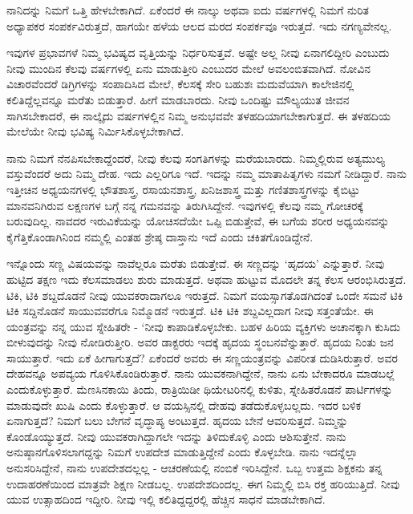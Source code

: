 ನಾನಿದನ್ನು ನಿಮಗೆ ಒತ್ತಿ ಹೇಳಬೇಕಾಗಿದೆ. ಏಕೆಂದರೆ ಈ ನಾಲ್ಕು ಅಥವಾ ಐದು ವರ್ಷಗಳಲ್ಲಿ ನಿಮಗೆ ನುರಿತ ಅಧ್ಯಾಪಕರ ಸಂಪರ್ಕವಿರುತ್ತದೆ, ಹಾಗಯೇ ಹಳೆಯ ಆಲದ ಮರದ ಸಂಪರ್ಕವೂ ಇರುತ್ತದೆ. ಇದು ನಗಣ್ಯವೇನಲ್ಲ.

ಇವುಗಳ ಪ್ರಭಾವಗಳೆ ನಿಮ್ಮ ಭವಿಷ್ಯದ ವೃತ್ತಿಯನ್ನು ನಿರ್ಧರಿಸುತ್ತವೆ. ಅಷ್ಟೇ ಅಲ್ಲ ನೀವು ಏನಾಗಲಿದ್ದೀರಿ ಎಂಬುದು ನೀವು ಮುಂದಿನ ಕೆಲವು ವರ್ಷಗಳಲ್ಲಿ ಏನು ಮಾಡುತ್ತೀರಿ ಎಂಬುದರ ಮೇಲೆ ಅವಲಂಬಿತವಾಗಿದೆ. ನೋವಿನ ವಿಚಾರವೆಂದರೆ ಡಿಗ್ರಿಗಳನ್ನು ಸಂಪಾದಿಸಿದ ಮೇಲೆ, ಕೆಲಸಕ್ಕೆ ಸೇರಿ ಬಹುಶಃ ಮದುವೆಯಾಗಿ ಕಾಲೇಜಿನಲ್ಲಿ ಕಲಿತಿದ್ದೆಲ್ಲವನ್ನೂ ಮರೆತು ಬಿಡುತ್ತಾರೆ. ಹೀಗೆ ಮಾಡಬಾರದು. ನೀವು ಒಂದಿಷ್ಟು ಮೌಲ್ಯಯುತ ಜೀವನ ಸಾಗಿಸಬೇಕಾದರೆ, ಈ ನಾಲ್ಕೈದು ವರ್ಷಗಳಲ್ಲಿನ ನಿಮ್ಮ ಅನುಭವವೇ ತಳಹದಿಯಾಗಬೇಕಾಗುತ್ತದೆ. ಈ ತಳಹದಿಯ ಮೇಲೆಯೇ ನೀವು ಭವಿಷ್ಯ ನಿರ್ಮಿಸಿಕೊಳ್ಳಬೇಕಾಗಿದೆ.

ನಾನು ನಿಮಗೆ ನೆನಪಿಸಬೇಕಾದ್ದೆಂದರೆ, ನೀವು ಕೆಲವು ಸಂಗತಿಗಳನ್ನು ಮರೆಯಬಾರದು. ನಿಮ್ಮಲ್ಲಿರುವ ಅತ್ಯಮುಲ್ಯ ವಸ್ತುವೆಂದರೆ ಅದು ನಿಮ್ಮ ದೇಹ. ಇದು ಎಲ್ಲರಿಗೂ ಇದೆ. ಇದನ್ನು ನಮ್ಮ ಮಾತಾಪಿತೃಗಳು ನಮಗೆ ನೀಡಿದ್ದಾರೆ. ನಾನು ಇತ್ತೀಚಿನ ಅಧ್ಯಯನಗಳಲ್ಲಿ ಭೌತಶಾಸ್ತ್ರ, ರಸಾಯನಶಾಸ್ತ್ರ, ಖನಿಜಶಾಸ್ತ್ರ ಮತ್ತು ಗಣಿತಶಾಸ್ತ್ರಗಳನ್ನು ಕೈಬಿಟ್ಟು ಮಾನವನಿಗಿರುವ ಲಕ್ಷಣಗಳ ಬಗ್ಗೆ ನನ್ನ ಗಮನವನ್ನು ತಿರುಗಿಸಿದ್ದೇನೆ. ಇವುಗಳಲ್ಲಿ ಕೆಲವು ನಮ್ಮ ಗೋಚರಕ್ಕೆ ಬರುವುದಿಲ್ಲ. ನಾವದರ ಇರುವಿಕೆಯನ್ನು ಯೋಚಿಸದೆಯೇ ಒಪ್ಪಿ ಬಿಡುತ್ತೇವೆ, ಈ ಬಗೆಯ ಶರೀರ ಅಧ್ಯಯನವನ್ನು ಕೈಗೆತ್ತಿಕೊಂಡಾಗಿನಿಂದ ನಮ್ಮಲ್ಲಿ ಎಂತಹ ಶ್ರೇಷ್ಠ ದಾಸ್ತಾನು ಇದೆ ಎಂದು ಚಕಿತಗೊಂಡಿದ್ದೇನೆ.

ಇನ್ನೊಂದು ಸಣ್ಣ ವಿಷಯವನ್ನು ನಾವೆಲ್ಲರೂ ಮರೆತು ಬಿಡುತ್ತೇವೆ. ಈ ಸಣ್ಣದನ್ನು ‘ಹೃದಯ’ ಎನ್ನುತ್ತಾರೆ. ನೀವು ಹುಟ್ಟಿದ ತಕ್ಷಣ ಇದು ಕೆಲಸಮಾಡಲು ಶುರು ಮಾಡುತ್ತದೆ. ಅಥವಾ ಹುಟ್ಟುವ ಮೊದಲೇ ತನ್ನ ಕೆಲಸ ಆರಂಭಿಸಿರುತ್ತದೆ. ಟಿಕಿ, ಟಿಕಿ ಶಬ್ದದೊಡನೆ ನೀವು ಯುವಕರಾದಾಗಲೂ ಇರುತ್ತದೆ. ನಿಮಗೆ ವಯಸ್ಸಾಗತೊಡಗಿದಂತೆ ಒಂದೇ ಸಮನೆ ಟಿಕಿ ಟಿಕಿ ಸದ್ದಿನೊಡನೆ ಸಾಯುವವರೆಗೂ ನಿಮ್ಮೊಡನೆ ಇರುತ್ತದೆ. ಟಿಕಿ ಟಿಕಿ ಶಬ್ದವಿಲ್ಲದಾಗ ನೀವು ಸತ್ತಂತೆಯೇ. ಈ ಯಂತ್ರವನ್ನು ನನ್ನ ಯುವ ಸ್ನೇಹಿತರೇ - ‘ನೀವು ಕಾಪಾಡಿಕೊಳ್ಳಬೇಕು. ಬಹಳ ಹಿರಿಯ ವ್ಯಕ್ತಿಗಳು ಅಚಾನಕ್ಕಾಗಿ ಕುಸಿದು ಬೀಳುವುದನ್ನು ನೀವು ನೋಡಿರುತ್ತೀರಿ. ಅವರ ಡಾಕ್ಟರರು ಇದಕ್ಕೆ ಹೃದಯ ಸ್ಥಂಬನವೆನ್ನುತ್ತಾರೆ. ಹೃದಯ ನಿಂತು ಜನ ಸಾಯುತ್ತಾರೆ. ಇದು ಏಕೆ ಹೀಗಾಗುತ್ತದೆ? ಏಕೆಂದರೆ ಅವರು ಈ ಸಣ್ಣಯಂತ್ರವನ್ನು ವಿಪರೀತ ದುಡಿಸಿರುತ್ತಾರೆ. ಅವರ ದೇಹವನ್ನೂ ಅಪವ್ಯಯ ಗೊಳಿಸಿಕೊಂಡಿರುತ್ತಾರೆ. ನಾನು ಯುವಕನಾಗಿದ್ದೇನೆ, ನಾನು ಏನು ಬೇಕಾದರೂ ಮಾಡಬಲ್ಲೆ ಎಂದುಕೊಳ್ಳುತ್ತಾರೆ. ಮೆಣಸಿನಕಾಯಿ ತಿಂದು, ರಾತ್ರಿಯಿಡೀ ಥಿಯೇಟರಿನಲ್ಲಿ ಕುಳಿತು, ಸ್ನೇಹಿತರೊಡನೆ ಪಾರ್ಟಿಗಳನ್ನು ಮಾಡುವುದೇ ಖುಷಿ ಎಂದು ಕೊಳ್ಳುತ್ತಾರೆ. ಆ ವಯಸ್ಸಿನಲ್ಲಿ ದೇಹವು ತಡೆದುಕೊಳ್ಳಬಲ್ಲದು. ಇದರ ಬಳಿಕ ಏನಾಗುತ್ತದೆ? ನಿಮಗೆ ಬಲು ಬೇಗನೆ ವೃದ್ಧಾಪ್ಯ ಅಂಟುತ್ತದೆ. ಹೃದಯ ಬೇನೆ ಆವರಿಸುತ್ತದೆ. ನಿಮ್ಮನ್ನು ಕೊಂಡೊಯ್ಯುತ್ತದೆ. ನೀವು ಯುವಕರಾಗಿದ್ದಾಗಲೇ ಇದನ್ನು ತಿಳಿದುಕೊಳ್ಳಿ ಎಂದು ಆಶಿಸುತ್ತೇನೆ. ನಾನು ಅನುಷ್ಠಾನಗೊಳಿಸಲಾಗದ್ದನ್ನು ನಿಮಗೆ ಉಪದೇಶ ಮಾಡುತ್ತಿದ್ದೇನೆ ಎಂದು ಕೊಳ್ಳಬೇಡಿ. ನಾನು ಇದನ್ನೆಲ್ಲಾ ಅನುಸರಿಸಿದ್ದೇನೆ, ನಾನು ಉಪದೇಶದಲ್ಲಲ್ಲ - ಆಚರಣೆಯಲ್ಲಿ ನಂಬಿಕೆ ಇರಿಸಿದ್ದೇನೆ. ಒಬ್ಬ ಉತ್ತಮ ಶಿಕ್ಷಕನು ತನ್ನ ಉದಾಹರಣೆಯಿಂದ ಮಾತ್ರವೇ ಶಿಕ್ಷಣ ನೀಡಬಲ್ಲ. ಉಪದೇಶದಿಂದಲ್ಲ. ಈಗ ನಿಮ್ಮಲ್ಲಿ ಬಿಸಿ ರಕ್ತ ಹರಿಯುತ್ತಿದೆ. ನೀವು ಯುವ ಉತ್ಸಾಹದಿಂದ ಇದ್ದೀರಿ. ನೀವು ಇಲ್ಲಿ ಕಲಿತಿದ್ದದ್ದರಲ್ಲಿ ಹೆಚ್ಚಿನ ಸಾಧನೆ ಮಾಡಬೇಕಾಗಿದೆ.

